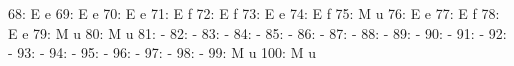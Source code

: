 \documentclass[nojss]{jss}
\begin{document}
\begin{Schunk}
\begin{Soutput}
 68:                                          E                               e
 69:                                          E                               e
 70:                                          E                               e
 71:                                          E                               f
 72:                                          E                               f
 73:                                          E                               e
 74:                                          E                               f
 75:                                          M                               u
 76:                                          E                               e
 77:                                          E                               f
 78:                                          E                               e
 79:                                          M                               u
 80:                                          M                               u
 81:                                                                          -
 82:                                                                          -
 83:                                                                          -
 84:                                                                          -
 85:                                                                          -
 86:                                                                          -
 87:                                                                          -
 88:                                                                          -
 89:                                                                          -
 90:                                                                          -
 91:                                                                          -
 92:                                                                          -
 93:                                                                          -
 94:                                                                          -
 95:                                                                          -
 96:                                                                          -
 97:                                                                          -
 98:                                                                          -
 99:                                          M                               u
100:                                          M                               u

\end{Soutput}
\end{Schunk}
\end{document}
